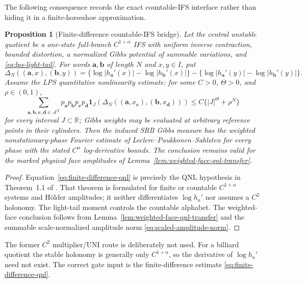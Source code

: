 \documentclass[11pt]{article}
\newtheorem{proposition}[theorem]{Proposition}
\newcommand{\one}{\mathbf 1}
\begin{document}
The following consequence records the exact countable-IFS interface rather
than hiding it in a finite-horseshoe approximation.

\begin{proposition}[Finite-difference countable-IFS bridge]
\label{prop:countable-ifs-bridge}
Let the central unstable quotient be a one-state full-branch
$C^{1+\alpha}$ IFS with uniform inverse contraction, bounded distortion, a
normalized Gibbs potential of summable variations, and
\eqref{eq:lps-light-tail}.  For words $\mathbf a,\mathbf b$ of length $N$
and $x,y\in I$, put
\[
 \Delta_N((\mathbf a,x),(\mathbf b,y))
 =\{\log|h_{\mathbf a}'(x)|-\log|h_{\mathbf b}'(x)|\}
  -\{\log|h_{\mathbf a}'(y)|-\log|h_{\mathbf b}'(y)|\}.
\]
Assume the LPS quantitative nonlinearity estimate: for some
$C>0$, $\Theta>0$, and $\rho\in(0,1)$,
\begin{equation}
\label{eq:finite-difference-qnl}
 \sum_{\mathbf a,\mathbf b,\mathbf c,\mathbf d\in\mathcal A^N}
 p_{\mathbf a}p_{\mathbf b}p_{\mathbf c}p_{\mathbf d}
 \one_{J}\!\left(
 \Delta_N((\mathbf a,x_{\mathbf c}),
          (\mathbf b,x_{\mathbf d}))\right)
 \le C\{|J|^\Theta+\rho^N\}
\end{equation}
for every interval $J\subset\mathbb R$; Gibbs weights may be evaluated at
arbitrary reference points in their cylinders.  Then the induced SRB Gibbs
measure has the weighted nonstationary-phase Fourier estimate of
Leclerc--Paukkonen--Sahlsten for every phase with the stated
$C^\alpha$ log-derivative bounds.  The conclusion remains valid for the
marked physical face amplitudes of
Lemma~\ref{lem:weighted-face-qnl-transfer}.
\end{proposition}

\begin{proof}
Equation~\eqref{eq:finite-difference-qnl} is precisely the QNL hypothesis in
Theorem~1.1 of \cite{LPS}.  That theorem is formulated for finite or
countable $C^{1+\alpha}$ systems and H\"older amplitudes; it neither
differentiates $\log h_a'$ nor assumes a $C^2$ holonomy.  The light-tail
moment controls the countable alphabet.  The weighted-face conclusion follows
from Lemma~\ref{lem:weighted-face-qnl-transfer} and the summable
scale-normalized amplitude norm \eqref{eq:scaled-amplitude-norm}.
\end{proof}

The former $C^2$ multiplier/UNI route is deliberately not used.  For a
billiard quotient the stable holonomy is generally only $C^{1+\alpha}$, so
the derivative of $\log h_a'$ need not exist.  The correct gate input is the
finite-difference estimate \eqref{eq:finite-difference-qnl}.
\end{document}
